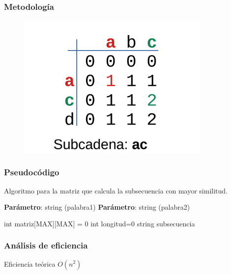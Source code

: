 \documentclass[13pt]{beamer}
\begin{document}
    \begin{frame}
        \frametitle{Metodología}
        \begin{figure}[H] 
            \centering
            \includegraphics[width=0.85\textwidth]{dibujito.pdf}
        \end{figure}
    \end{frame}



    \begin{frame}
        \frametitle{Pseudocódigo}
        \begin{algorithm}[H]
            \caption{Algoritmo para la matriz que calcula la subsecuencia con mayor similitud.}\label{alg:simil}
            \begin{minipage}{0.92\textwidth}
            \textbf{Parámetro}: string (palabra1)\;
            \textbf{Parámetro}: string (palabra2)
            \end{minipage}
          
            int matriz[MAX][MAX] = {0}\;
            int longitud=0\;
            string subsecuencia\;
          
             {
               {
              }
            }
          \end{algorithm}
    \end{frame}

	\begin{frame}
		\frametitle{Análisis de eficiencia}
		
		\begin{block}{Eficiencia teórica}
			\centering
			$O(n^{2})$
		\end{block}
		
	\end{frame}
\end{document}
